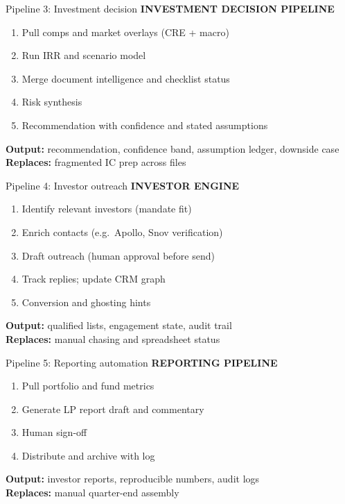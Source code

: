 \documentclass[aspectratio=169,11pt]{beamer}
\begin{document}
\begin{frame}{Pipeline 3: Investment decision}
  \small
  \textbf{INVESTMENT DECISION PIPELINE}
  \begin{enumerate}
    \item Pull comps and market overlays (CRE + macro)
    \item Run IRR and scenario model
    \item Merge document intelligence and checklist status
    \item Risk synthesis
    \item Recommendation with confidence and stated assumptions
  \end{enumerate}
  \textbf{Output:} recommendation, confidence band, assumption ledger, downside case\\
  \textbf{Replaces:} fragmented IC prep across files
\end{frame}

\begin{frame}{Pipeline 4: Investor outreach}
  \small
  \textbf{INVESTOR ENGINE}
  \begin{enumerate}
    \item Identify relevant investors (mandate fit)
    \item Enrich contacts (e.g.\ Apollo, Snov verification)
    \item Draft outreach (human approval before send)
    \item Track replies; update CRM graph
    \item Conversion and ghosting hints
  \end{enumerate}
  \textbf{Output:} qualified lists, engagement state, audit trail\\
  \textbf{Replaces:} manual chasing and spreadsheet status
\end{frame}

\begin{frame}{Pipeline 5: Reporting automation}
  \small
  \textbf{REPORTING PIPELINE}
  \begin{enumerate}
    \item Pull portfolio and fund metrics
    \item Generate LP report draft and commentary
    \item Human sign-off
    \item Distribute and archive with log
  \end{enumerate}
  \textbf{Output:} investor reports, reproducible numbers, audit logs\\
  \textbf{Replaces:} manual quarter-end assembly
\end{frame}
\end{document}
